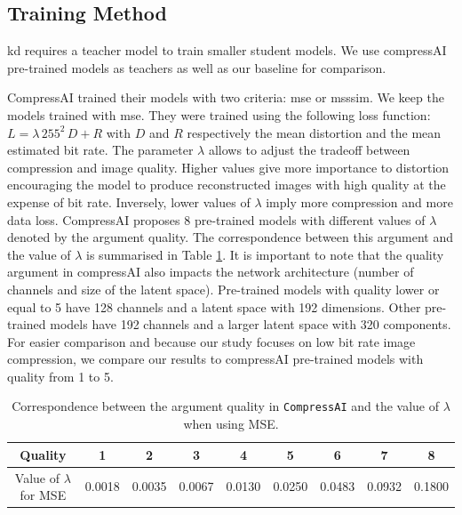 \documentclass{article}
\begin{document}
\subsection{Training Method}
\label{training_method}
\acrshort{kd} requires a teacher model to train smaller student models. We use compressAI pre-trained models as teachers as well as our baseline for comparison.

CompressAI trained their models with two criteria: \acrshort{mse} or \acrshort{msssim}. We keep the models trained with \acrshort{mse}. They were trained using the following loss function: \(L = \lambda\, 255^{2}\, D + R\) with \(D\) and \(R\) respectively the mean distortion and the mean estimated bit rate. The parameter \(\lambda\) allows to adjust the tradeoff between compression and image quality. Higher values give more importance to distortion encouraging the model to produce reconstructed images with high quality at the expense of bit rate. Inversely, lower values of \(\lambda\) imply more compression and more data loss. CompressAI proposes 8 pre-trained models with different values of \(\lambda\) denoted by the argument \textsf{quality}. The correspondence between this argument and the value of \(\lambda\) is summarised in Table \ref{tab_quality_lambda}. It is important to note that the \textsf{quality} argument in compressAI also impacts the network architecture (number of channels and size of the latent space). Pre-trained models with \textsf{quality} lower or equal to 5 have 128 channels and a latent space with 192 dimensions. Other pre-trained models have 192 channels and a larger latent space with 320 components. For easier comparison and because our study focuses on low bit rate image compression, we compare our results to compressAI pre-trained models with \textsf{quality} from 1 to 5.

\begin{table}[t]
    \centering
    \caption{Correspondence between the argument \textsf{quality} in \texttt{CompressAI} and the value of \(\lambda\) when using MSE.}
    \label{tab_quality_lambda}
    \begin{tabular}{ccccccccc}
        \toprule
        \textsf{Quality}             & 1      & 2      & 3      & 4      & 5      & 6      & 7      & 8      \\
        \midrule
        Value of \(\lambda\) for MSE & 0.0018 & 0.0035 & 0.0067 & 0.0130 & 0.0250 & 0.0483 & 0.0932 & 0.1800 \\
        \bottomrule
    \end{tabular}
\end{table}
\end{document}

